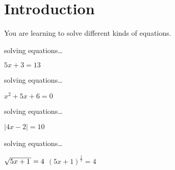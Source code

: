 \section{Introduction}

You are learning to solve different kinds of equations.

\newcommand{\myExtraVSpace}{\vspace{0\onelineskip}}

\begin{tcbraster}[
    raster equal height, 
    raster columns = 2,
    raster column skip = 0.5in,
]
    \begin{tcolorbox}[colback=white,boxrule=0.5pt,]
        \small
        solving  equations\dots
        \begin{center}
            $5x +3 = 13$
        \end{center}
        \whenSTUDENT{
            \myExtraVSpace
        }
    \end{tcolorbox}
    \begin{tcolorbox}[colback=white,boxrule=0.5pt,]
        \small
        solving  equations\dots
        \begin{center}
            $x^2 + 5x + 6 = 0$
        \end{center}
        \whenSTUDENT{
            \myExtraVSpace
        }
    \end{tcolorbox}
    \begin{tcolorbox}[colback=white,boxrule=0.5pt,]
        \small 
        solving  equations\dots
        \begin{center}
            $|4x -2 | = 10$
        \end{center}
        \whenSTUDENT{
            \myExtraVSpace
        }
    \end{tcolorbox}
    \begin{tcolorbox}[colback=white,boxrule=2pt,]
        \small 
        solving  equations\dots
        \begin{center}
            \hfill
            $\myRoot{5x+1} = 4$
            \hfill 
            $\left({5x+1}\right)^\frac{1}{2} = 4$
            \hfill\,
        \end{center}
        \whenSTUDENT{
            \myExtraVSpace
        }
    \end{tcolorbox}
\end{tcbraster}

